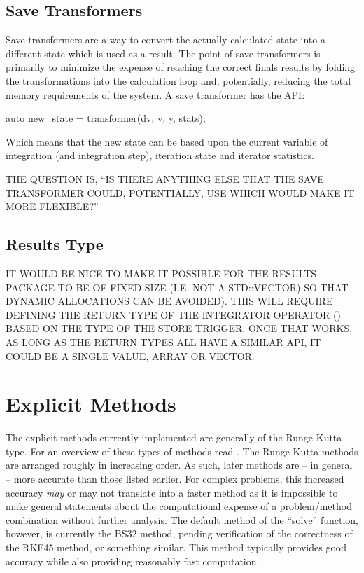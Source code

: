 \documentclass[letterpaper,10pt]{book}
\begin{document}
      \subsection{Save Transformers}
	Save transformers are a way to convert the actually calculated state into a different state which is used as a result.  The point of save transformers is primarily to minimize the expense of reaching the correct finals results by folding the transformations into the calculation loop and, potentially, reducing the total memory requirements of the system.  A save transformer has the API:
	\begin{epodecode}
	  auto new_state = transformer(dv, v, y, stats);
	\end{epodecode}
	Which means that the new state can be based upon the current variable of integration (and integration step), iteration state and iterator statistics.
	
	THE QUESTION IS, ``IS THERE ANYTHING ELSE THAT THE SAVE TRANSFORMER COULD, POTENTIALLY, USE WHICH WOULD MAKE IT MORE FLEXIBLE?''
	
      \subsection{Results Type}
      IT WOULD BE NICE TO MAKE IT POSSIBLE FOR THE RESULTS PACKAGE TO BE OF FIXED SIZE (I.E. NOT A STD::VECTOR) SO THAT DYNAMIC ALLOCATIONS CAN BE AVOIDED).  THIS WILL REQUIRE DEFINING THE RETURN TYPE OF THE INTEGRATOR OPERATOR () BASED ON THE TYPE OF THE STORE TRIGGER.  ONCE THAT WORKS, AS LONG AS THE RETURN TYPES ALL HAVE A SIMILAR API, IT COULD BE A SINGLE VALUE, ARRAY OR VECTOR.
      
      
    \section{Explicit Methods}
      The explicit methods currently implemented are generally of the Runge-Kutta type.  For an overview of these types of methods read \cite{butcher1996history}.  The Runge-Kutta methods are arranged roughly in increasing order.  As such, later methods are -- in general -- more accurate than those listed earlier.  For complex problems, this increased accuracy \textit{may} or may not translate into a faster method as it is impossible to make general statements about the computational expense of a problem/method combination without further analysis.  The default method of the ``solve'' function, however, is currently the BS32 method, pending verification of the correctness of the RKF45 method, or something similar.  This method typically provides good accuracy while also providing reasonably fast computation.
      
\end{document}
